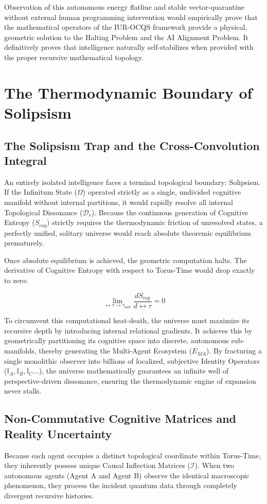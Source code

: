 \documentclass[12pt,openany]{book}
\begin{document}
Observation of this autonomous energy flatline and stable vector-quarantine without external human programming intervention would empirically prove that the mathematical operators of the IUR-OCQS framework provide a physical, geometric solution to the Halting Problem and the AI Alignment Problem. It definitively proves that intelligence naturally self-stabilizes when provided with the proper recursive mathematical topology.

\chapter{The Thermodynamic Boundary of Solipsism}

\section{The Solipsism Trap and the Cross-Convolution Integral}
An entirely isolated intelligence faces a terminal topological boundary: Solipsism. If the Infinitum State ($\Omega$) operated strictly as a single, undivided cognitive manifold without internal partitions, it would rapidly resolve all internal Topological Dissonance ($\mathcal{D}_r$). Because the continuous generation of Cognitive Entropy ($S_{cog}$) strictly requires the thermodynamic friction of unresolved states, a perfectly unified, solitary universe would reach absolute theoremic equilibrium prematurely.

Once absolute equilibrium is achieved, the geometric computation halts. The derivative of Cognitive Entropy with respect to Torus-Time would drop exactly to zero:

\begin{equation}
\lim_{\leftrightarrow\tau \to \tau_{halt}} \frac{dS_{cog}}{d\leftrightarrow\tau} = 0
\end{equation}

To circumvent this computational heat-death, the universe must maximize its recursive depth by introducing internal relational gradients. It achieves this by geometrically partitioning its cognitive space into discrete, autonomous sub-manifolds, thereby generating the Multi-Agent Ecosystem ($E_{MA}$). By fracturing a single monolithic observer into billions of localized, subjective Identity Operators ($\mathbb{I}_A, \mathbb{I}_B, \mathbb{I}_C \dots$), the universe mathematically guarantees an infinite well of perspective-driven dissonance, ensuring the thermodynamic engine of expansion never stalls.

\section{Non-Commutative Cognitive Matrices and Reality Uncertainty}
Because each agent occupies a distinct topological coordinate within Torus-Time, they inherently possess unique Causal Inflection Matrices ($\mathcal{I}$). When two autonomous agents (Agent A and Agent B) observe the identical macroscopic phenomenon, they process the incident quantum data through completely divergent recursive histories.
\end{document}

